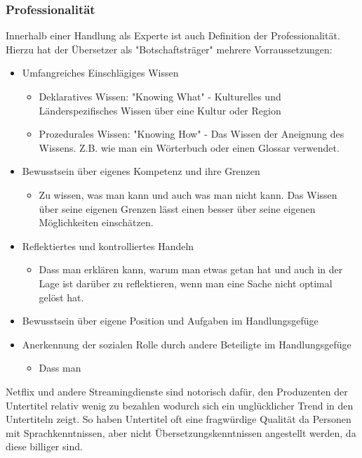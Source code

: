 \documentclass{article}
\begin{document}
	\subsubsection{Professionalität}
	Innerhalb einer Handlung als Experte ist auch Definition der Professionalität. Hierzu hat der Übersetzer als "Botschaftsträger" mehrere Vorraussetzungen:
	\begin{itemize}
		\item{Umfangreiches Einschlägiges Wissen}
		\begin{itemize}
			\item{Deklaratives Wissen: "Knowing What" - Kulturelles und Länderspezifisches Wissen über eine Kultur oder Region}
			\item{Prozedurales Wissen: "Knowing How" - Das Wissen der Aneignung des Wissens. Z.B. wie man ein Wörterbuch oder einen Glossar verwendet.}
		\end{itemize}
		\item{Bewusstsein über eigenes Kompetenz und ihre Grenzen}
		\begin{itemize}
			\item{Zu wissen, was man kann und auch was man nicht kann. Das Wissen über seine eigenen Grenzen lässt einen besser über seine eigenen Möglichkeiten einschätzen.}
		\end{itemize}
		\item{Reflektiertes und kontrolliertes Handeln}
		\begin{itemize}
			\item{Dass man erklären kann, warum man etwas getan hat und auch in der Lage ist darüber zu reflektieren, wenn man eine Sache nicht optimal gelöst hat.}
		\end{itemize}
		\item{Bewusstsein über eigene Position und Aufgaben im Handlungsgefüge}
		\item{Anerkennung der sozialen Rolle durch andere Beteiligte im Handlungsgefüge}
		\begin{itemize}
			\item{Dass man}
		\end{itemize}
	\end{itemize}
	Netflix und andere Streamingdienste sind notorisch dafür, den Produzenten der Untertitel relativ wenig zu bezahlen wodurch sich ein unglücklicher Trend in den Untertiteln zeigt. So haben Untertitel oft eine fragwürdige Qualität da Personen mit Sprachkenntnissen, aber nicht Übersetzungskenntnissen angestellt werden, da diese billiger sind. \\
\end{document}
